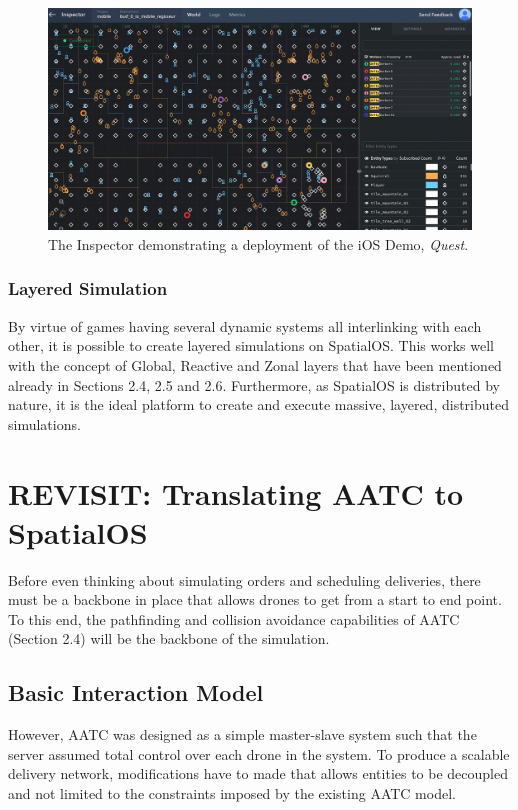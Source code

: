 \documentclass[a4paper,12pt,titlepage]{article}
\begin{document}
\begin{figure}[!hbpt]
  \center
  \includegraphics[width=\linewidth]{img/io_inspector.png}
  \caption{The Inspector demonstrating a deployment of the iOS Demo, \textit{Quest}. \cite{ImprobableWorldsLtd.2017}}
  \label{fig:bg_scalable_zones}
\end{figure}

\subsubsection{Layered Simulation}
By virtue of games having several dynamic systems all interlinking with each other, it is possible to create layered simulations on SpatialOS. This works well with the concept of Global, Reactive and Zonal layers that have been mentioned already in Sections 2.4, 2.5 and 2.6. Furthermore, as SpatialOS is distributed by nature, it is the ideal platform to create and execute massive, layered, distributed simulations.


\newpage
\section{REVISIT: Translating AATC to SpatialOS}
Before even thinking about simulating orders and scheduling deliveries, there must be a backbone in place that allows drones to get from a start to end point. To this end, the pathfinding and collision avoidance capabilities of AATC (Section 2.4) will be the backbone of the simulation.

\subsection{Basic Interaction Model}
However, AATC was designed as a simple master-slave system such that the server assumed total control over each drone in the system. To produce a scalable delivery network, modifications have to made that allows entities to be decoupled and not limited to the constraints imposed by the existing AATC model.
\end{document}
